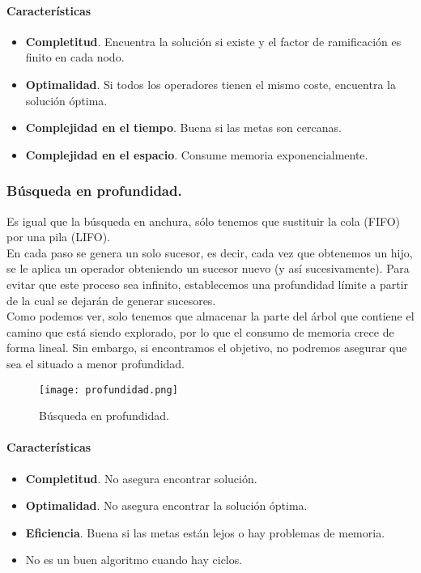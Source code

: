 \documentclass[12pt,spanish]{article}
\numberwithin{definition}{subsection}
\begin{document}
\paragraph{Características}
\begin{itemize}
	\item \textbf{Completitud}. Encuentra la solución si existe y el factor de ramificación es finito en cada nodo.
	\item \textbf{Optimalidad}. Si todos los operadores tienen el mismo coste, encuentra la solución óptima.
	\item \textbf{Complejidad en el tiempo}. Buena si las metas son cercanas.
	\item \textbf{Complejidad en el espacio}. Consume memoria exponencialmente.
\end{itemize}

\subsubsection{Búsqueda en profundidad.}

Es igual que la búsqueda en anchura, sólo tenemos que sustituir la cola (FIFO) por una pila (LIFO).\\

En cada paso se genera un solo sucesor, es decir, cada vez que obtenemos un hijo, se le aplica un operador obteniendo un sucesor nuevo (y así sucesivamente). Para evitar que este proceso sea infinito, establecemos una profundidad límite a partir de la cual se dejarán de generar sucesores.\\

Como podemos ver, solo tenemos que almacenar la parte del árbol que contiene el camino que está siendo explorado, por lo que el consumo de memoria crece de forma lineal. Sin embargo, si encontramos el objetivo, no podremos asegurar que sea el situado a menor profundidad.

\begin{figure}[H]
\centering
\texttt{[image: profundidad.png]}
\caption{Búsqueda en profundidad.}
\end{figure}

\paragraph{Características}
\begin{itemize}
	\item \textbf{Completitud}. No asegura encontrar solución.
	\item \textbf{Optimalidad}. No asegura encontrar la solución óptima.
	\item \textbf{Eficiencia}. Buena si las metas están lejos o hay problemas de memoria.
	\item No es un buen algoritmo cuando hay ciclos.
\end{itemize}
\end{document}
